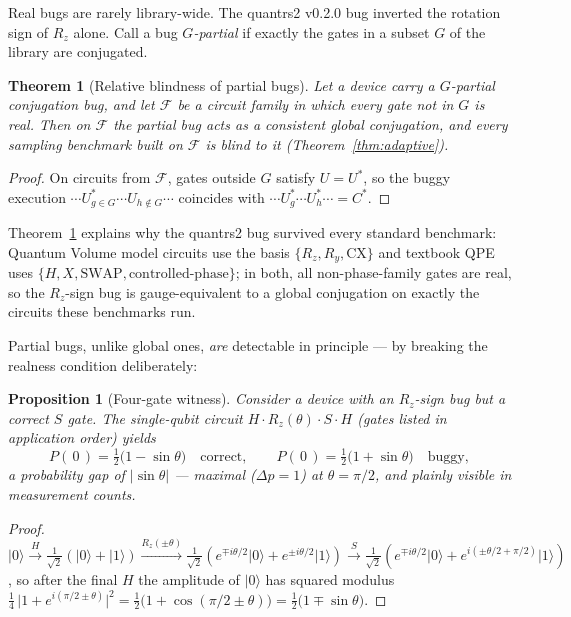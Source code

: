 \documentclass[11pt]{article}
\newtheorem{theorem}{Theorem}
\newtheorem{proposition}{Proposition}
\theoremstyle{definition}
\theoremstyle{remark}
\newcommand{\ket}[1]{\lvert #1 \rangle}
\begin{document}
Real bugs are rarely library-wide. The quantrs2 v0.2.0 bug inverted the
rotation sign of $R_z$ alone. Call a bug \emph{$G$-partial} if exactly
the gates in a subset $G$ of the library are conjugated.

\begin{theorem}[Relative blindness of partial bugs]\label{thm:partial}
Let a device carry a $G$-partial conjugation bug, and let $\mathcal{F}$
be a circuit family in which every gate \emph{not} in $G$ is real. Then
on $\mathcal{F}$ the partial bug acts as a consistent global
conjugation, and every sampling benchmark built on $\mathcal{F}$ is
blind to it (Theorem~\ref{thm:adaptive}).
\end{theorem}

\begin{proof}
On circuits from $\mathcal{F}$, gates outside $G$ satisfy
$U = U^{*}$, so the buggy execution
$\cdots U^{*}_{g\in G} \cdots U_{h\notin G}\cdots$
coincides with $\cdots U^{*}_{g} \cdots U^{*}_{h}\cdots = C^{*}$.
\end{proof}

Theorem~\ref{thm:partial} explains why the quantrs2 bug survived every
standard benchmark: Quantum Volume model circuits use the basis
$\{R_z, R_y, \mathrm{CX}\}$ and textbook QPE uses
$\{H, X, \mathrm{SWAP}, \mathrm{controlled\text{-}phase}\}$; in both,
all non-phase-family gates are real, so the $R_z$-sign bug is
gauge-equivalent to a global conjugation on exactly the circuits these
benchmarks run.

Partial bugs, unlike global ones, \emph{are} detectable in principle ---
by breaking the realness condition deliberately:

\begin{proposition}[Four-gate witness]\label{prop:witness}
Consider a device with an $R_z$-sign bug but a correct $S$ gate. The
single-qubit circuit $H \cdot R_z(\theta)\cdot S \cdot H$ (gates listed
in application order) yields
\[
P(\,0\,) = \tfrac{1}{2}\bigl(1 - \sin\theta\bigr)
\quad\text{correct},
\qquad
P(\,0\,) = \tfrac{1}{2}\bigl(1 + \sin\theta\bigr)
\quad\text{buggy},
\]
a probability gap of $|\sin\theta|$ --- maximal ($\Delta p = 1$) at
$\theta = \pi/2$, and plainly visible in measurement counts.
\end{proposition}

\begin{proof}
$\ket{0} \xrightarrow{H} \tfrac{1}{\sqrt2}(\ket{0}+\ket{1})
\xrightarrow{R_z(\pm\theta)} \tfrac{1}{\sqrt2}
 (e^{\mp i\theta/2}\ket{0}+e^{\pm i\theta/2}\ket{1})
\xrightarrow{S} \tfrac{1}{\sqrt2}
 (e^{\mp i\theta/2}\ket{0}+e^{i(\pm\theta/2+\pi/2)}\ket{1})$,
so after the final $H$ the amplitude of $\ket{0}$ has squared modulus
$\tfrac14\,\lvert 1+e^{i(\pi/2\pm\theta)}\rvert^{2}
=\tfrac12\bigl(1+\cos(\pi/2\pm\theta)\bigr)
=\tfrac12\bigl(1\mp\sin\theta\bigr)$.
\end{proof}
\end{document}
